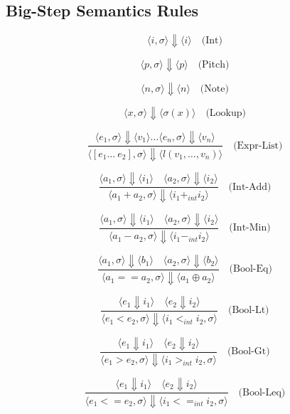 \documentclass[letterpaper,12pt]{article}
\begin{document}
\subsection{Big-Step Semantics Rules}

    \[
    \langle i, \sigma \rangle \Downarrow \langle i \rangle \quad \text{(Int)}
    \]

    \[
    \langle p, \sigma \rangle \Downarrow \langle p \rangle \quad \text{(Pitch)}
    \]

    \[
    \langle n, \sigma \rangle \Downarrow \langle n \rangle \quad \text{(Note)}
    \]
    
    \[
    \langle x, \sigma \rangle \Downarrow \langle \sigma{(x)} \rangle \quad \text{(Lookup)}
    \]

    \[
    \frac{\langle e_1, \sigma \rangle \Downarrow \langle v_1 \rangle \dots \langle e_n, \sigma \rangle \Downarrow \langle v_n \rangle}{\langle [e_1 \dots \ e_2], \sigma \rangle \Downarrow \langle l(v_1, \dots, v_n) \rangle} \quad \text{(Expr-List)}
    \]

    \[
    \frac{\langle a_1, \sigma \rangle \Downarrow \langle i_1 \rangle \quad \langle a_2, \sigma \rangle \Downarrow \langle i_2 \rangle}{\langle a_1 + a_2, \sigma \rangle \Downarrow \langle i_1 +_{int} i_2 \rangle} \quad \text{(Int-Add)}
    \]

    \[
    \frac{\langle a_1, \sigma \rangle \Downarrow \langle i_1 \rangle \quad \langle a_2, \sigma \rangle \Downarrow \langle i_2 \rangle}{\langle a_1 - a_2, \sigma \rangle \Downarrow \langle i_1 -_{int} i_2 \rangle} \quad \text{(Int-Min)}
    \]

    \[
    \frac{\langle a_1, \sigma \rangle \Downarrow \langle b_1 \rangle \quad \langle a_2, \sigma \rangle \Downarrow \langle b_2 \rangle}{\langle a_1 == a_2, \sigma \rangle \Downarrow \langle a_1 \oplus a_2 \rangle} \quad \text{(Bool-Eq)}
    \]

    \[
    \frac{\langle e_1 \Downarrow i_1 \rangle \quad \langle e_2 \Downarrow i_2 \rangle}
    {\langle e_1 < e_2 , \sigma\rangle \Downarrow \langle i_1 <_{int} i_2 , \sigma\rangle}  {} \quad \text{(Bool-Lt)}
    \]
    
    \[
    \frac{\langle e_1 \Downarrow i_1 \rangle \quad \langle e_2 \Downarrow i_2 \rangle}
    {\langle e_1 > e_2 , \sigma\rangle \Downarrow \langle i_1 >_{int} i_2 , \sigma\rangle}  {} \quad \text{(Bool-Gt)}
    \]

    \[
    \frac{\langle e_1 \Downarrow i_1 \rangle \quad \langle e_2 \Downarrow i_2 \rangle}
    {\langle e_1 <= e_2 , \sigma\rangle \Downarrow \langle i_1 <=_{int} i_2 , \sigma\rangle}  {} \quad \text{(Bool-Leq)}
    \]
    
\end{document}
